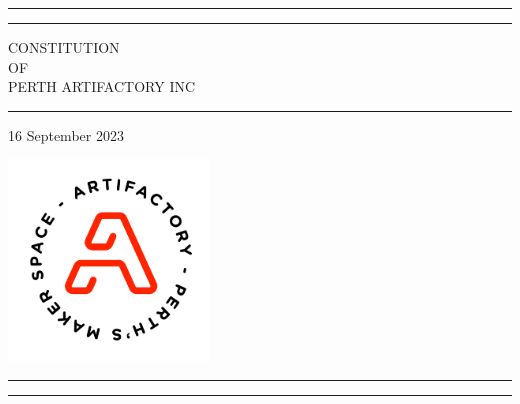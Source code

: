 \documentclass[12pt]{article}
\begin{document}

\begin{titlepage}


  \centering %


  \rule{\textwidth}{1pt} %

  \vspace{2pt}\vspace{-10mm} %

  \rule{\textwidth}{0.4pt} %

  \vspace{0.1\textheight} %


  {\Huge CONSTITUTION }\\[0.5\baselineskip] %
  {\Large OF}\\[0.5\baselineskip] %
  {\Huge PERTH ARTIFACTORY INC} %

  \vspace{0.025\textheight} %

  \rule{0.4\textwidth}{0.4pt} %

  \vspace{0.05\textheight}
  16 September 2023
  \vspace{0.2\textheight}

  \includegraphics[width=0.4\textwidth]{Artifactory_logo_COMBO-ROUND_ORANGE.png}

  \vfill

  \rule{\textwidth}{0.4pt} %
  \vspace{2pt}\vspace{-10mm} %
  \rule{\textwidth}{1pt} %

\end{titlepage}
\end{document}
